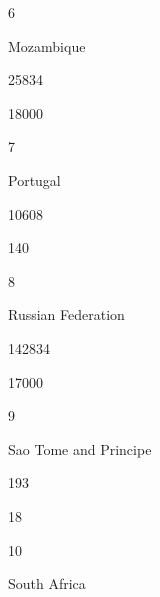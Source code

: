 \documentclass[letterpaper,10pt,english]{sphinxmanual}
\begin{document}
6





Mozambique





25834





18000









7





Portugal





10608





140









8





Russian Federation





142834





17000









9





Sao Tome and Principe





193





18









10





South Africa
\end{document}

